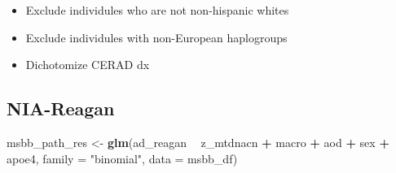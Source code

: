\documentclass[]{book}
\newenvironment{Shaded}{\begin{snugshade}}{\end{snugshade}}
\newcommand{\DataTypeTok}[1]{\textcolor[rgb]{0.13,0.29,0.53}{#1}}
\newcommand{\KeywordTok}[1]{\textcolor[rgb]{0.13,0.29,0.53}{\textbf{#1}}}
\newcommand{\NormalTok}[1]{#1}
\newcommand{\OperatorTok}[1]{\textcolor[rgb]{0.81,0.36,0.00}{\textbf{#1}}}
\newcommand{\StringTok}[1]{\textcolor[rgb]{0.31,0.60,0.02}{#1}}
\providecommand{\tightlist}{%
  \setlength{\itemsep}{0pt}\setlength{\parskip}{0pt}}
\begin{document}
\begin{itemize}
\tightlist
\item
  Exclude individules who are not non-hispanic whites
\item
  Exclude individules with non-European haplogroups
\item
  Dichotomize CERAD dx
\end{itemize}

\begin{Shaded}
\end{Shaded}

\hypertarget{nia-reagan}{%
\subsection{NIA-Reagan}\label{nia-reagan}}

\begin{Shaded}
\begin{Highlighting}[]
\NormalTok{msbb_path_res <-}\StringTok{ }\KeywordTok{glm}\NormalTok{(ad_reagan }\OperatorTok{~}\StringTok{ }\NormalTok{z_mtdnacn }\OperatorTok{+}\StringTok{ }\NormalTok{macro }\OperatorTok{+}\StringTok{ }\NormalTok{aod }\OperatorTok{+}\StringTok{ }\NormalTok{sex }\OperatorTok{+}\StringTok{ }\NormalTok{apoe4, }
                       \DataTypeTok{family =} \StringTok{"binomial"}\NormalTok{, }\DataTypeTok{data =}\NormalTok{ msbb_df)}
\end{Highlighting}
\end{Shaded}
\end{document}
